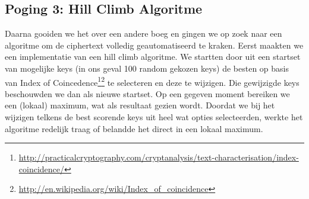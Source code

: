 \subsection{Poging 3: Hill Climb Algoritme}
Daarna gooiden we het over een andere boeg en gingen we op zoek naar een algoritme om de ciphertext volledig geautomatiseerd te kraken. Eerst maakten we een implementatie van een hill climb algoritme. We startten door uit een startset van mogelijke keys (in ons geval 100 random gekozen keys) de besten op basis van Index of Coincedence\footnote{\url{http://practicalcryptography.com/cryptanalysis/text-characterisation/index-coincidence/}}\footnote{\url{http://en.wikipedia.org/wiki/Index_of_coincidence}} te selecteren en deze te wijzigen. Die gewijzigde keys beschouwden we dan als nieuwe startset. Op een gegeven moment bereiken we een (lokaal) maximum, wat als resultaat gezien wordt. Doordat we bij het wijzigen telkens de best scorende keys uit heel wat opties selecteerden, werkte het algoritme redelijk traag of belandde het direct in een lokaal maximum.

